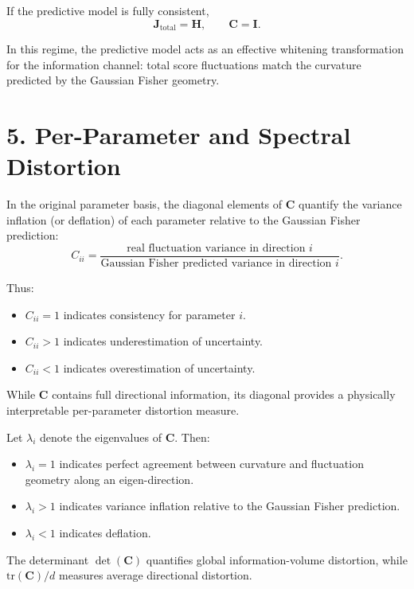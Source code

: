 \documentclass[11pt]{article}
\begin{document}
If the predictive model is fully consistent,
\begin{equation}
\mathbf J_{\mathrm{total}} = \mathbf H,
\qquad
\mathbf C = \mathbf I.
\end{equation}

In this regime, the predictive model acts as an effective whitening transformation for the information channel: total score fluctuations match the curvature predicted by the Gaussian Fisher geometry.

\section*{5. Per-Parameter and Spectral Distortion}

In the original parameter basis, the diagonal elements of $\mathbf C$ quantify the variance inflation (or deflation) of each parameter relative to the Gaussian Fisher prediction:
\begin{equation}
C_{ii}
=
\frac{\text{real fluctuation variance in direction } i}
     {\text{Gaussian Fisher predicted variance in direction } i}.
\end{equation}

Thus:
\begin{itemize}
\item $C_{ii} = 1$ indicates consistency for parameter $i$.
\item $C_{ii} > 1$ indicates underestimation of uncertainty.
\item $C_{ii} < 1$ indicates overestimation of uncertainty.
\end{itemize}

While $\mathbf C$ contains full directional information, its diagonal provides a physically interpretable per-parameter distortion measure.

Let $\lambda_i$ denote the eigenvalues of $\mathbf C$. Then:
\begin{itemize}
\item $\lambda_i = 1$ indicates perfect agreement between curvature and fluctuation geometry along an eigen-direction.
\item $\lambda_i > 1$ indicates variance inflation relative to the Gaussian Fisher prediction.
\item $\lambda_i < 1$ indicates deflation.
\end{itemize}

The determinant $\det(\mathbf C)$ quantifies global information-volume distortion, while $\mathrm{tr}(\mathbf C)/d$ measures average directional distortion.
\end{document}

